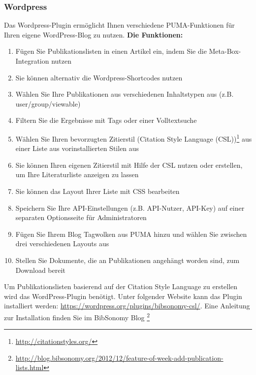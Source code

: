 \subsubsection{Wordpress}
Das Wordpress-Plugin ermöglicht Ihnen verschiedene PUMA-Funktionen für Ihren eigene WordPress-Blog zu nutzen.\newline\newline
\textbf{Die Funktionen:}
\begin{enumerate}
   \item Fügen Sie Publikationslisten in einen Artikel ein, indem Sie die Meta-Box-Integration nutzen
    \item Sie können alternativ die Wordpress-Shortcodes nutzen
    \item Wählen Sie Ihre Publikationen aus verschiedenen Inhaltstypen aus (z.B. user/group/viewable)
    \item Filtern Sie die Ergebnisse mit Tags oder einer Volltextsuche
    \item Wählen Sie Ihren bevorzugten Zitierstil (Citation Style Language (CSL))\footnote{\url{ http://citationstyles.org/}}  aus einer Liste aus vorinstallierten Stilen aus
    \item Sie können Ihren eigenen Zitierstil mit Hilfe der CSL nutzen oder erstellen, um Ihre Literaturliste anzeigen zu lassen
    \item Sie können das Layout Ihrer Liste mit CSS bearbeiten
    \item Speichern Sie Ihre API-Einstellungen (z.B. API-Nutzer, API-Key) auf einer separaten Optionsseite für Administratoren
    \item Fügen Sie Ihrem Blog Tagwolken aus PUMA hinzu und wählen Sie zwischen drei verschiedenen Layouts aus
    \item Stellen Sie Dokumente, die an Publikationen angehängt worden sind, zum Download bereit
\end{enumerate} 
Um Publikationslisten basierend auf der Citation Style Language zu erstellen wird das WordPress-Plugin benötigt. Unter folgender Website kann das Plugin installiert werden: \url{https://wordpress.org/plugins/bibsonomy-csl/}. Eine Anleitung zur Installation finden Sie im BibSonomy Blog \footnote{\url{http://blog.bibsonomy.org/2012/12/feature-of-week-add-publication-lists.html}}
